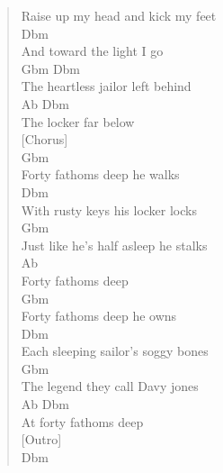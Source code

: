 \documentclass[11pt]{article}
\begin{document}
\begin{verse}
Raise up my head and kick my feet\\
\hspace*{4em}Dbm\\
And toward the light I go\\
\hspace*{4em}Gbm              Dbm\\
The heartless jailor left behind\\
\hspace*{4em}Ab         Dbm\\
The locker far below\\
\vspace*{1em}
\vspace*{1em}
[Chorus]\\
Gbm\\
Forty fathoms deep he walks\\
\hspace*{5em}Dbm\\
With rusty keys his locker locks\\
\hspace*{5em}Gbm\\
Just like he's half asleep he stalks\\
Ab\\
Forty fathoms deep\\
Gbm\\
Forty fathoms deep he owns\\
\hspace*{5em}Dbm\\
Each sleeping sailor's soggy bones\\
\hspace*{4em}Gbm\\
The legend they call Davy jones\\
\hspace*{3em}Ab            Dbm\\
At forty fathoms deep\\
\vspace*{1em}
\vspace*{1em}
[Outro]\\
Dbm\\
\end{verse}
\clearpage
\end{document}
